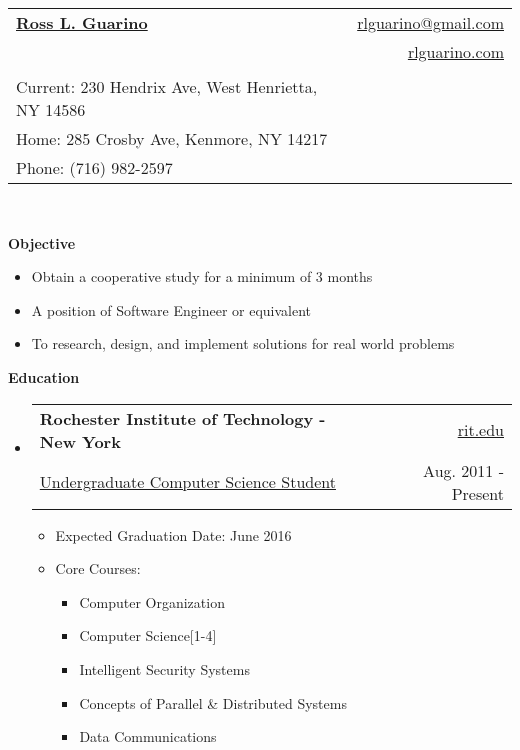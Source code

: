 \documentclass[letterpaper,11pt]{article}
\makeatletter
\newcommand{\resheading}[1]{{\large \colorbox{mygrey}{\begin{minipage}{\textwidth}{\textbf{#1 \vphantom{p\^{E}}}}\end{minipage}}}}
\newcommand{\ressubheading}[4]{
\begin{tabular*}{6.5in}{l@{\extracolsep{\fill}}r}
		\textbf{#1} & #2 \\
		{#3} & {#4} \\
\end{tabular*}\vspace{-6pt}}
\makeatother
\begin{document}
 

\thispagestyle{empty}
\pagestyle{empty}

\newcommand{\mywebheader}{
\begin{tabular*}{7in}{l@{\extracolsep{\fill}}r} \\
	\textbf{\href{http://www.rlguarino.com/}{\large Ross L. Guarino}} & \href{mailto:rlguarino@gmail.com}{rlguarino@gmail.com}\\ &
	\href{http://rlguarino.com/}{rlguarino.com} \\ \vspace{-10mm} \\
	{\footnotesize {{Current: 230 Hendrix Ave,
West Henrietta, NY 14586}}} & \\
	{\footnotesize {{Home: 285 Crosby Ave, Kenmore, NY 14217}}} & \\
	{\footnotesize {{Phone: (716) 982-2597}}} 	\end{tabular*}
\\
\vspace{0.1in}}

\mywebheader

\resheading{Objective}
{
	\footnotesize
	\begin{itemize}
		\item{Obtain a cooperative study for a minimum of 3 months}
		\item{A position of Software Engineer or equivalent}
		\item{To research, design, and implement solutions for real world problems}
	\end{itemize}
}
\resheading{Education}
	{ \footnotesize
	\begin{itemize}
		\item
			\ressubheading{Rochester Institute of Technology - New York}{\href{http://www.rit.edu}{rit.edu}}{\href{http://www.cs.rit.edu/}{Undergraduate Computer Science Student}}{Aug. 2011 - Present}
				{ \footnotesize
				\begin{itemize}
					\item{Expected Graduation Date: June 2016}
					\item{Core Courses:}
						\begin{itemize}
							\item{Computer Organization}
							\item{Computer Science[1-4]}
                                                        \item{Intelligent Security Systems}
							\item{Concepts of Parallel \& Distributed Systems}
							\item{Data Communications}
						\end{itemize}
				\end{itemize}
				}
	\end{itemize} %
	}
\end{document}
